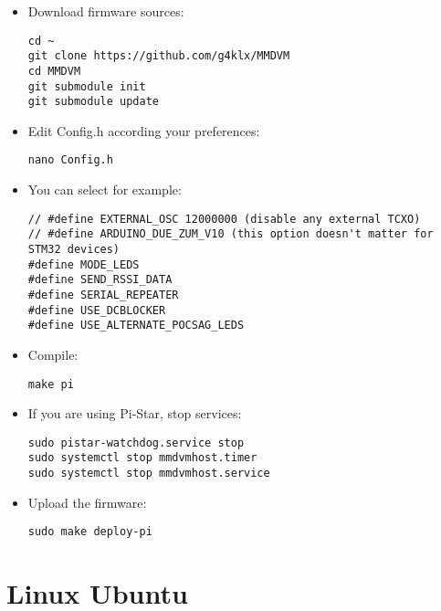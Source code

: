 \documentclass[]{article}
\begin{document}
\begin{itemize}[leftmargin=*]
	
\item Download firmware sources:
\begin{lstlisting}[style=DOS]
cd ~
git clone https://github.com/g4klx/MMDVM
cd MMDVM
git submodule init
git submodule update
\end{lstlisting}

\item Edit Config.h according your preferences:
\begin{lstlisting}[style=DOS]
nano Config.h
\end{lstlisting}

\item You can select for example:

\begin{verbatim}
// #define EXTERNAL_OSC 12000000 (disable any external TCXO)
// #define ARDUINO_DUE_ZUM_V10 (this option doesn't matter for STM32 devices)
#define MODE_LEDS
#define SEND_RSSI_DATA
#define SERIAL_REPEATER
#define USE_DCBLOCKER
#define USE_ALTERNATE_POCSAG_LEDS
\end{verbatim}

\item Compile:
\begin{lstlisting}[style=DOS]
make pi
\end{lstlisting}

\item If you are using Pi-Star, stop services:

\begin{lstlisting}[style=DOS]
sudo pistar-watchdog.service stop
sudo systemctl stop mmdvmhost.timer
sudo systemctl stop mmdvmhost.service
\end{lstlisting}

\item Upload the firmware:
\begin{lstlisting}[style=DOS]
sudo make deploy-pi
\end{lstlisting}

\end{itemize}

\section{Linux Ubuntu}
\end{document}
